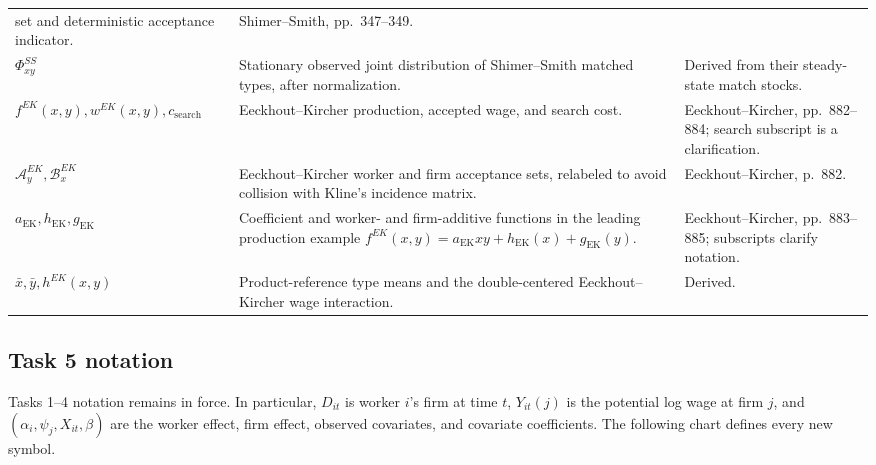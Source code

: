\documentclass[11pt]{article}
\begin{document}
\begin{longtable}{p{}p{}p{}}
set and deterministic acceptance indicator. & Shimer--Smith,
pp.\ 347--349. \\
\(\Phi^{SS}_{xy}\) & Stationary observed joint distribution of
Shimer--Smith matched types, after normalization. & Derived from their
steady-state match stocks. \\
\(f^{EK}(x,y),w^{EK}(x,y),c_{\mathrm{search}}\) & Eeckhout--Kircher
production, accepted wage, and search cost. & Eeckhout--Kircher,
pp.\ 882--884; search subscript is a clarification. \\
\(\mathcal A_y^{EK},\mathcal B_x^{EK}\) & Eeckhout--Kircher worker and firm
acceptance sets, relabeled to avoid collision with Kline's incidence matrix. &
Eeckhout--Kircher, p.\ 882. \\
\(a_{\mathrm{EK}},h_{\mathrm{EK}},g_{\mathrm{EK}}\) & Coefficient and
worker- and firm-additive functions in the leading production example
\(f^{EK}(x,y)=a_{\mathrm{EK}}xy+h_{\mathrm{EK}}(x)+g_{\mathrm{EK}}(y)\). &
Eeckhout--Kircher, pp.\ 883--885; subscripts clarify notation. \\
\(\bar x,\bar y,h^{EK}(x,y)\) & Product-reference type means and the
double-centered Eeckhout--Kircher wage interaction. & Derived. \\
\end{longtable}
\subsection{Task 5 notation}

Tasks 1--4 notation remains in force.  In particular, \(D_{it}\) is worker
\(i\)'s firm at time \(t\), \(Y_{it}(j)\) is the potential log wage at firm
\(j\), and \((\alpha_i,\psi_j,X_{it},\beta)\) are the worker effect, firm
effect, observed covariates, and covariate coefficients.  The following chart
defines every new symbol.
\end{document}
